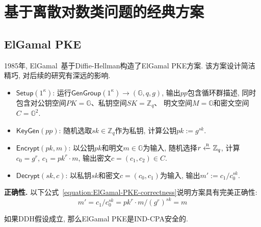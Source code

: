 \section{基于离散对数类问题的经典方案}
\subsection{ElGamal PKE}
1985年, ElGamal~\cite{ElGamal-IEEE-IT-1985}基于Diffie-Hellman构造了ElGamal PKE方案. 
该方案设计简洁精巧, 对后续的研究有深远的影响. 
\begin{definition}
\begin{itemize}
\item $\mathsf{Setup}(1^\kappa)$: 运行$\mathsf{GenGroup}(1^\kappa) \rightarrow (\mathbb{G}, q, g)$, 
	输出$pp$包含循环群描述, 同时包含对公钥空间$PK = \mathbb{G}$、私钥空间$SK = \mathbb{Z}_q$、
	明文空间$M = \mathbb{G}$和密文空间$C = \mathbb{G}^2$. 

\item $\mathsf{KeyGen}(pp)$: 随机选取$sk \in \mathbb{Z}_q$作为私钥, 计算公钥$pk:= g^{sk}$. 
  
\item $\mathsf{Encrypt}(pk, m)$: 以公钥$pk$和明文$m \in \mathbb{G}$为输入, 
	随机选择$r \xleftarrow{\textup{\tiny R}} \mathbb{Z}_q$, 计算$c_0 = g^r$, $c_1 = pk^r \cdot m$, 输出密文$c = (c_1, c_2) \in C$. 

\item $\mathsf{Decrypt}(sk, c)$: 以私钥$sk$和密文$c = (c_0, c_1)$为输入, 输出$m':= c_1/c_0^{sk}$.
\end{itemize}
\end{definition}

\begin{trivlist}
\item \textbf{正确性.} 以下公式~\ref{equation:ElGamal-PKE-correctness}说明方案具有完美正确性: 
\begin{equation}\label{equation:ElGamal-PKE-correctness}
	m' = c_1/c_0^{sk} = pk^r \cdot m/(g^r)^{sk} = m
\end{equation}
\end{trivlist}

\begin{theorem}\label{theorem:ElGamal-PKE-CPA}
如果DDH假设成立, 那么ElGamal PKE是IND-CPA安全的. 
\end{theorem}


